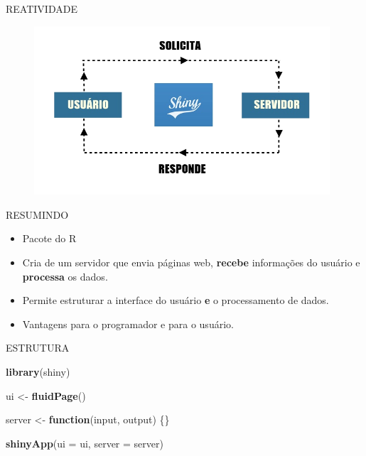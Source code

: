 \documentclass[
  ignorenonframetext,
]{beamer}
\newenvironment{Shaded}{\begin{snugshade}}{\end{snugshade}}
\newcommand{\ControlFlowTok}[1]{\textcolor[rgb]{0.13,0.29,0.53}{\textbf{#1}}}
\newcommand{\DataTypeTok}[1]{\textcolor[rgb]{0.13,0.29,0.53}{#1}}
\newcommand{\KeywordTok}[1]{\textcolor[rgb]{0.13,0.29,0.53}{\textbf{#1}}}
\newcommand{\NormalTok}[1]{#1}
\newcommand{\StringTok}[1]{\textcolor[rgb]{0.31,0.60,0.02}{#1}}
\begin{document}
\begin{frame}{REATIVIDADE}
\protect\hypertarget{reatividade}{}

\begin{figure}
\includegraphics[width=110mm]{imagens/cxv}
\end{figure}

\end{frame}

\begin{frame}{RESUMINDO}
\protect\hypertarget{resumindo}{}

\begin{itemize}
\item Pacote do R
\item Cria de um servidor que envia páginas web, \textbf{recebe} informações do usuário e \textbf{processa} os dados.
\item Permite estruturar a interface do usuário \textbf{e} o processamento de dados.
\item Vantagens para o programador e para o usuário.
\end{itemize}

\end{frame}

\begin{frame}[fragile]{ESTRUTURA}
\protect\hypertarget{estrutura}{}

\begin{Shaded}
\begin{Highlighting}[]
\KeywordTok{library}\NormalTok{(shiny)}

\NormalTok{ui <-}\StringTok{ }\KeywordTok{fluidPage}\NormalTok{()}

\NormalTok{server <-}\StringTok{ }\ControlFlowTok{function}\NormalTok{(input, output) \{\}}

\KeywordTok{shinyApp}\NormalTok{(}\DataTypeTok{ui =}\NormalTok{ ui, }\DataTypeTok{server =}\NormalTok{ server)}
\end{Highlighting}
\end{Shaded}

\end{frame}
\end{document}
